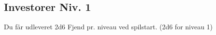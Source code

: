 \subsection*{Investorer Niv. 1}
Du får udleveret 2d6 Fjend pr. niveau ved spilstart. (2d6 for niveau 1)\\